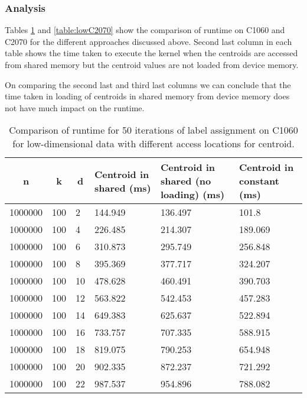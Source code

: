 \subsubsection{Analysis}
Tables \ref{table:lowC1060} and \ref{table:lowC2070} show the comparison of runtime on C1060 and C2070 for the different approaches discussed above. Second last column in each table shows the time taken to execute the kernel when the centroids are accessed from shared memory but the centroid values are not loaded from device memory.

On comparing the second last and third last columns we can conclude that the time taken in loading of centroids in shared memory from device memory does not have much impact on the runtime.

\begin{table}[htbp]
\begin{center}
\begin{tabular}{|p{2cm}|p{1cm}|p{1cm}|p{2.5cm}|p{2.5cm}|p{2.5cm}|}
\hline
\multicolumn{1}{|c|}{n} & \multicolumn{1}{c|}{k} & \multicolumn{1}{c|}{d} & \multicolumn{1}{p{2.5cm}|}{Centroid in shared (ms)} & \multicolumn{1}{p{2.5cm}|}{Centroid in shared (no loading) (ms)} & \multicolumn{1}{p{2.5cm}|}{Centroid in constant (ms)} \\ \hline
1000000 & 100 & 2 & 144.949 & 136.497 & 101.8 \\ \hline
1000000 & 100 & 4 & 226.485 & 214.307 & 189.069 \\ \hline
1000000 & 100 & 6 & 310.873 & 295.749 & 256.848 \\ \hline
1000000 & 100 & 8 & 395.369 & 377.717 & 324.207 \\ \hline
1000000 & 100 & 10 & 478.628 & 460.491 & 390.703 \\ \hline
1000000 & 100 & 12 & 563.822 & 542.453 & 457.283 \\ \hline
1000000 & 100 & 14 & 649.383 & 625.637 & 522.894 \\ \hline
1000000 & 100 & 16 & 733.757 & 707.335 & 588.915 \\ \hline
1000000 & 100 & 18 & 819.075 & 790.253 & 654.948 \\ \hline
1000000 & 100 & 20 & 902.335 & 872.237 & 721.292 \\ \hline
1000000 & 100 & 22 & 987.537 & 954.896 & 788.082 \\ \hline
\end{tabular}
\end{center}
\caption{Comparison of runtime for 50 iterations of label assignment on C1060 for low-dimensional data with different access locations for centroid.}
\label{table:lowC1060}
\end{table}

